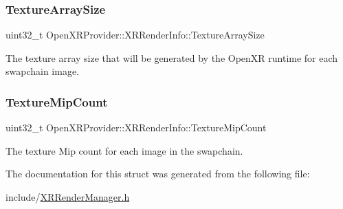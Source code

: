 \mbox{\label{struct_open_x_r_provider_1_1_x_r_render_info_a9bf5bd224350b3fcc79a1643b8cc85f6}} 
\subsubsection{\texorpdfstring{TextureArraySize}{TextureArraySize}}
{\footnotesize\ttfamily uint32\+\_\+t Open\+X\+R\+Provider\+::\+X\+R\+Render\+Info\+::\+Texture\+Array\+Size}



The texture array size that will be generated by the Open\+XR runtime for each swapchain image. 

\mbox{\label{struct_open_x_r_provider_1_1_x_r_render_info_ad86a33b90d0f38aa11a3cd4e0dc521b4}} 
\subsubsection{\texorpdfstring{TextureMipCount}{TextureMipCount}}
{\footnotesize\ttfamily uint32\+\_\+t Open\+X\+R\+Provider\+::\+X\+R\+Render\+Info\+::\+Texture\+Mip\+Count}



The texture Mip count for each image in the swapchain. 



The documentation for this struct was generated from the following file\+:\begin{DoxyCompactItemize}
\item 
include/\mbox{\hyperlink{_x_r_render_manager_8h}{X\+R\+Render\+Manager.\+h}}\end{DoxyCompactItemize}
